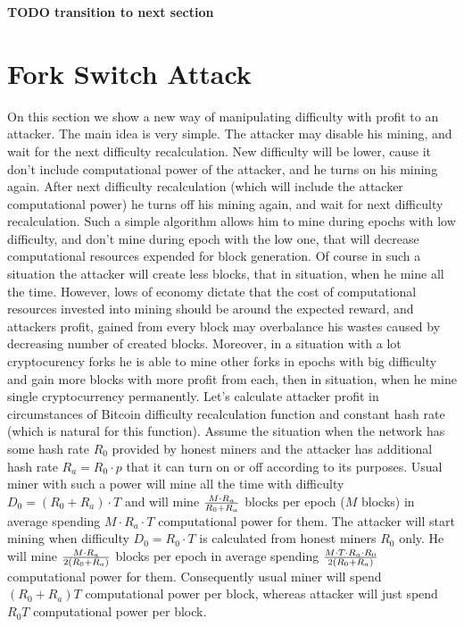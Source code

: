 \documentclass[number,preprint,review]{elsarticle}
\begin{document}
\textbf{TODO transition to next section}

\section{Fork Switch Attack}
\label{sec:attack}

On this section we show a new way of manipulating difficulty with profit to an attacker.
The main idea is very simple.
The attacker may disable his mining, and wait for the next difficulty recalculation.
New difficulty will be lower, cause it don't include computational power of the attacker, and he turns on his mining again.
After next difficulty recalculation (which will include the attacker computational power) he turns off his mining again, and wait for next difficulty recalculation.
Such a simple algorithm allows him to mine during epochs with low difficulty, and don't mine during epoch with the low one, that will decrease computational resources expended for block generation.
Of course in such a situation the attacker will create less blocks, that in situation, when he mine all the time.
However, lows of economy dictate that the cost of computational resources invested into mining should be around the expected reward, and attackers profit, gained from every block may overbalance his wastes caused by decreasing number of created blocks.
Moreover, in a situation with a lot cryptocurency forks he is able to mine other forks in epochs with big difficulty and gain more blocks with more profit from each, then in situation, when he mine single cryptocurrency permanently.
Let's calculate attacker profit in circumstances of Bitcoin difficulty recalculation function and constant hash rate (which is natural for this function).
Assume the situation when the network has some hash rate \(R_0\) provided by honest miners and the attacker has additional hash rate \(R_a=R_0\cdot p\) that it can turn on or off according to its purposes.
Usual miner with such a power will mine all the time with difficulty \(D_0=(R_0+R_a)\cdot T\) and will mine \(M\cdot R_a\over R_0+R_a\) blocks per epoch (\(M\) blocks) in average spending \(M\cdot R_a\cdot T\) computational power for them.
The attacker will start mining when difficulty \(D_0=R_0\cdot T\) is calculated from honest miners \(R_0\) only.
He will mine \(M\cdot R_a\over 2(R_0+R_a)\) blocks per epoch in average spending \(M\cdot T\cdot R_a\cdot R_0\over 2(R_0+R_a)\) computational power for them.
Consequently usual miner will spend \((R_0+R_a)T\) computational power per block, whereas attacker will just spend \(R_0T\) computational power per block.
\end{document}

